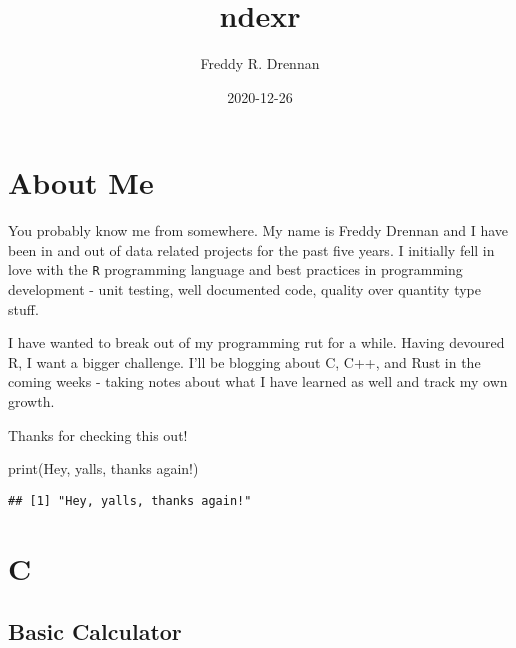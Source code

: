 \documentclass[
]{book}
\title{ndexr}
\author{Freddy R. Drennan}
\date{2020-12-26}
\newenvironment{Shaded}{\begin{snugshade}}{\end{snugshade}}
\newcommand{\FunctionTok}[1]{\textcolor[rgb]{0.00,0.00,0.00}{#1}}
\newcommand{\NormalTok}[1]{#1}
\newcommand{\StringTok}[1]{\textcolor[rgb]{0.31,0.60,0.02}{#1}}
\begin{document}
\maketitle

{
\setcounter{tocdepth}{1}
\tableofcontents
}
\hypertarget{about-me}{%
\chapter{About Me}\label{about-me}}

You probably know me from somewhere. My name is Freddy Drennan and I have been in and out of data related projects for the past five years. I initially fell in love with the \texttt{R} programming language and best practices in programming development - unit testing, well documented code, quality over quantity type stuff.

I have wanted to break out of my programming rut for a while. Having devoured R, I want a bigger challenge. I'll be blogging about C, C++, and Rust in the coming weeks - taking notes about what I have learned as well and track my own growth.

Thanks for checking this out!

\begin{Shaded}
\begin{Highlighting}[]
\FunctionTok{print}\NormalTok{(}\StringTok{\textquotesingle{}Hey, yalls, thanks again!\textquotesingle{}}\NormalTok{)}
\end{Highlighting}
\end{Shaded}

\begin{verbatim}
## [1] "Hey, yalls, thanks again!"
\end{verbatim}

\hypertarget{c}{%
\chapter{C}\label{c}}

\hypertarget{basic-calculator}{%
\section{Basic Calculator}\label{basic-calculator}}
\end{document}

